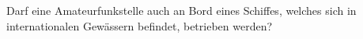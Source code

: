\documentclass[12pt,a4paper,ngerman]{article}
\theoremstyle{definition}
\theoremstyle{plain}
\theoremstyle{mytheorem}
\theoremstyle{definition}
\begin{document}
    \begin{tikzpicture}[scale=1]
        
    \end{tikzpicture}




Darf eine Amateurfunkstelle auch an Bord eines Schiffes, welches sich in internationalen Gewässern befindet, betrieben werden?


%


%

\begin{description}

\end{description}




%
\end{document}

